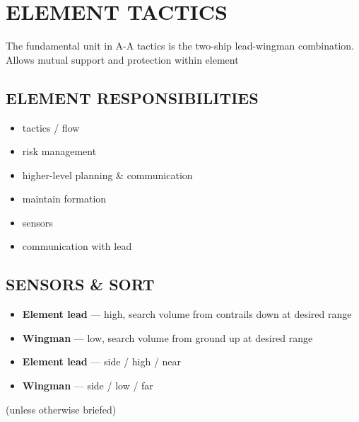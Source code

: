 \section{ELEMENT TACTICS}

\begin{tcoloritemize}
    \blueitem[Element]
    The fundamental unit in A-A tactics is the two-ship lead-wingman combination.
    Allows mutual support and protection within element
\end{tcoloritemize}

\subsection{ELEMENT RESPONSIBILITIES}

\begin{tcoloritemize}
    \blueitem[Lead]
    \begin{itemize}
        \item tactics / flow
        \item risk management
        \item higher-level planning \& communication
    \end{itemize}

    \blueitem[Wingman]
    \begin{itemize}
        \item maintain formation
        \item sensors
        \item communication with lead
    \end{itemize}
\end{tcoloritemize}

\subsection{SENSORS \& SORT}

\begin{tcoloritemize}
    \begin{itemize}
        \item \textbf{Element lead} --- high, search volume from contrails down at desired range
        \item \textbf{Wingman} --- low, search volume from ground up at desired range
    \end{itemize}
    \begin{itemize}
        \item \textbf{Element lead} --- side / high / near
        \item \textbf{Wingman} --- side / low / far
    \end{itemize}
    \hfill(unless otherwise briefed)
\end{tcoloritemize}

